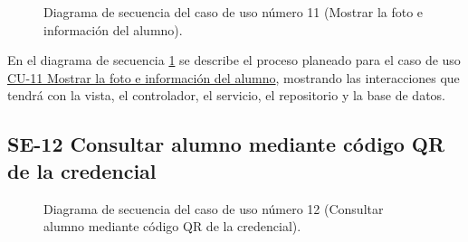 \begin{figure}[htbp!]
	\begin{center}
		\caption{Diagrama de secuencia del caso de uso número 11 (Mostrar la foto e información  del alumno).}
		\label{fig:Diagrama de secuencia CU-11}
	\end{center}
\end{figure}


En el diagrama de secuencia \ref{fig:Diagrama de secuencia CU-11} se describe el proceso planeado para el caso de uso \hyperlink{CU-11}{CU-11 Mostrar la foto e información  del alumno}, mostrando las interacciones que tendrá con la vista, el controlador, el servicio, el repositorio y la base de datos.

\newpage

\subsection{SE-12 Consultar alumno mediante código QR de la credencial}

\begin{figure}[htbp!]
	\begin{center}
		\caption{Diagrama de secuencia del caso de uso número 12 (Consultar alumno mediante código QR de la credencial).}
		\label{fig:Diagrama de secuencia CU-12}
	\end{center}
\end{figure}

